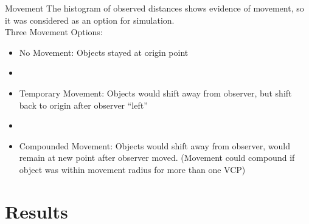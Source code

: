 \documentclass{beamer}
\begin{document}
\begin{frame}{Movement}
	The histogram of observed distances shows evidence of movement, so it was considered as an option for simulation.\\
	\vspace{0.33cm}
	Three Movement Options:
	\begin{itemize}
	\item No Movement: Objects stayed at origin point
	\item[]
	\item Temporary Movement: Objects would shift away from observer, but shift back to origin after observer ``left''
	\item[]
	\item Compounded Movement: Objects would shift away from observer, would remain at new point after observer moved. (Movement could compound if object was within movement radius for more than one VCP)
	\end{itemize}
	
\end{frame}
\section{Results}
\end{document}
